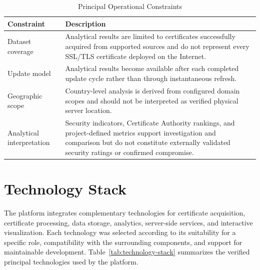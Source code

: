 \begin{table}[H]
  \centering
  \footnotesize
  \setlength{\tabcolsep}{4pt}
  \renewcommand{\arraystretch}{1.05}
  \caption{Principal Operational Constraints}
  \label{tab:principal-operational-constraints}
  \begin{tabularx}{\textwidth}{@{}>{\RaggedRight\arraybackslash}p{}Y@{}}
    \toprule
    \textbf{Constraint} & \textbf{Description} \\
    \midrule
    Dataset coverage & Analytical results are limited to certificates successfully acquired from supported sources and do not represent every SSL/TLS certificate deployed on the Internet. \\
    Update model & Analytical results become available after each completed update cycle rather than through instantaneous refresh. \\
    Geographic scope & Country-level analysis is derived from configured domain scopes and should not be interpreted as verified physical server location. \\
    Analytical interpretation & Security indicators, Certificate Authority rankings, and project-defined metrics support investigation and comparison but do not constitute externally validated security ratings or confirmed compromise. \\
    \bottomrule
  \end{tabularx}
\end{table}

\clearpage
\section{Technology Stack}
\label{sec:technology-stack}

The platform integrates complementary technologies for certificate
acquisition, certificate processing, data storage, analytics, server-side
services, and interactive visualization. Each technology was selected
according to its suitability for a specific role, compatibility with the
surrounding components, and support for maintainable development.
Table~\ref{tab:technology-stack} summarizes the verified principal
technologies used by the platform.

